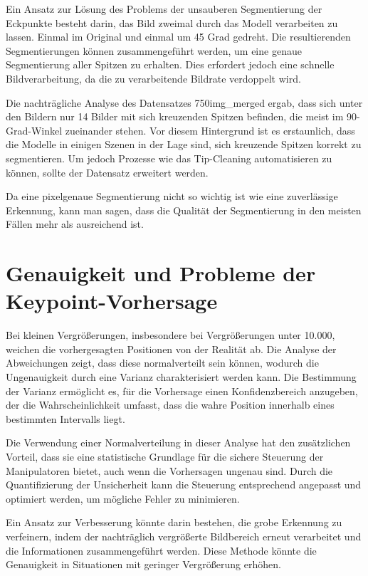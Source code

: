Ein Ansatz zur Lösung des Problems der unsauberen Segmentierung der Eckpunkte besteht darin, das Bild zweimal durch das Modell verarbeiten zu lassen. Einmal im Original und einmal um 45 Grad gedreht. Die resultierenden Segmentierungen können zusammengeführt werden, um eine genaue Segmentierung aller Spitzen zu erhalten. Dies erfordert jedoch eine schnelle Bildverarbeitung, da die zu verarbeitende Bildrate verdoppelt wird.

Die nachträgliche Analyse des Datensatzes \glqq 750img\_merged\grqq{} ergab, dass sich unter den Bildern nur 14 Bilder mit sich kreuzenden Spitzen befinden, die meist im 90-Grad-Winkel zueinander stehen. Vor diesem Hintergrund ist es erstaunlich, dass die Modelle in einigen Szenen in der Lage sind, sich kreuzende Spitzen korrekt zu segmentieren. Um jedoch Prozesse wie das Tip-Cleaning automatisieren zu können, sollte der Datensatz erweitert werden.

Da eine pixelgenaue Segmentierung nicht so wichtig ist wie eine zuverlässige Erkennung, kann man sagen, dass die Qualität der Segmentierung in den meisten Fällen mehr als ausreichend ist.
\section{Genauigkeit und Probleme der Keypoint-Vorhersage}
Bei kleinen Vergrößerungen, insbesondere bei Vergrößerungen unter 10.000, weichen die vorhergesagten Positionen von der Realität ab. Die Analyse der Abweichungen zeigt, dass diese normalverteilt sein können, wodurch die Ungenauigkeit durch eine Varianz charakterisiert werden kann. Die Bestimmung der Varianz ermöglicht es, für die Vorhersage einen Konfidenzbereich anzugeben, der die Wahrscheinlichkeit umfasst, dass die wahre Position innerhalb eines bestimmten Intervalls liegt.

Die Verwendung einer Normalverteilung in dieser Analyse hat den zusätzlichen Vorteil, dass sie eine statistische Grundlage für die sichere Steuerung der Manipulatoren bietet, auch wenn die Vorhersagen ungenau sind. Durch die Quantifizierung der Unsicherheit kann die Steuerung entsprechend angepasst und optimiert werden, um mögliche Fehler zu minimieren.

Ein Ansatz zur Verbesserung könnte darin bestehen, die grobe Erkennung zu verfeinern, indem der nachträglich vergrößerte Bildbereich erneut verarbeitet und die Informationen zusammengeführt werden. Diese Methode könnte die Genauigkeit in Situationen mit geringer Vergrößerung erhöhen.

